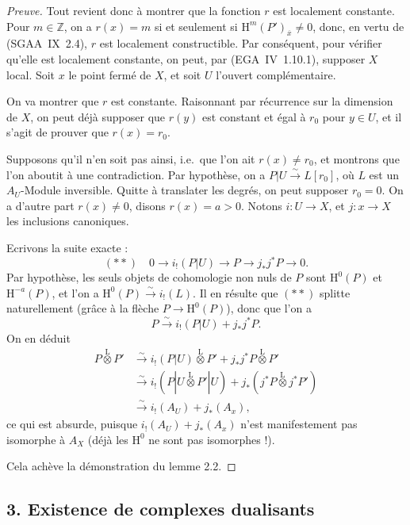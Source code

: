 \documentclass[11pt]{article}
\renewcommand{\H}{\mathrm{H}}
\newcommand{\Z}{\mathbb{Z}}
\newcommand{\ol}[1]{\overline{#1}}
\providecommand{\Z}{\mathbb Z}
\begin{document}
\begin{proof}[Preuve]
Tout revient donc à montrer que la fonction $r$ est localement constante. Pour $m \in \Z$, on a $r(x) = m$ si et seulement si $\H^{m}(P')_{\ol{x}} \neq 0$, donc, en vertu de (SGAA~IX~2.4), $r$ est localement constructible. Par conséquent, pour vérifier qu'elle est localement constante, on peut, par (EGA~IV~1.10.1), supposer $X$ local. Soit $x$ le point fermé de $X$, et soit $U$ l'ouvert complémentaire.

On va montrer que $r$ est constante. Raisonnant par récurrence sur la dimension de $X$, on peut déjà supposer que $r(y)$ est constant et égal à $r_0$ pour $y \in U$, et il s'agit de prouver que $r(x) = r_0$.

Supposons qu'il n'en soit pas ainsi, i.e.~que l'on ait $r(x) \neq r_0$, et montrons que l'on aboutit à une contradiction. Par hypothèse, on a $P|U \xrightarrow{\sim} L[r_0]$, où $L$ est un $A_U$-Module inversible. Quitte à translater les degrés, on peut supposer $r_0 = 0$. On a d'autre part $r(x) \neq 0$, disons $r(x) = a > 0$. Notons $i : U \to X$, et $j : x \to X$ les inclusions canoniques.

Ecrivons la suite exacte :
\[
(**) \quad 0 \longrightarrow i_{!}(P|U) \longrightarrow P \longrightarrow j_{*}j^{*}P \longrightarrow 0.
\]
Par hypothèse, les seuls objets de cohomologie non nuls de $P$ sont $\H^{0}(P)$ et $\H^{-a}(P)$, et l'on a $\H^{0}(P) \xrightarrow{\sim} i_{!}(L)$. Il en résulte que $(**)$ splitte naturellement (grâce à la flèche $P \to \H^{0}(P)$), donc que l'on a
\[
P \xrightarrow{\sim} i_{!}(P|U) + j_{*}j^{*}P.
\]
On en déduit
\begin{align*}
P \mathop{\otimes}\limits^{\mathrm{L}} P' &\xrightarrow{\sim} i_{!}(P|U) \mathop{\otimes}\limits^{\mathrm{L}} P' + j_{*}j^{*}P \mathop{\otimes}\limits^{\mathrm{L}} P' \\
&\xrightarrow{\sim} i_{!}(P|U \mathop{\otimes}\limits^{\mathrm{L}} P'|U) + j_{*}(j^{*}P \mathop{\otimes}\limits^{\mathrm{L}} j^{*}P') \\
&\xrightarrow{\sim} i_{!}(A_U) + j_{*}(A_x),
\end{align*}
ce qui est absurde, puisque $i_{!}(A_U) + j_{*}(A_x)$ n'est manifestement pas isomorphe à $A_X$ (déjà les $\H^{0}$ ne sont pas isomorphes !).

Cela achève la démonstration du lemme 2.2.
\end{proof}

\subsection{3. Existence de complexes dualisants}
\end{document}

